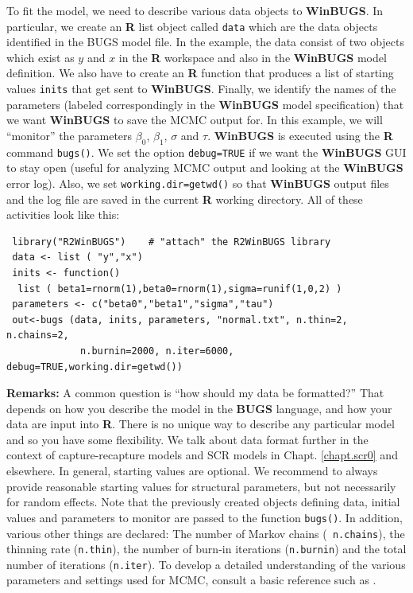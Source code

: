 To fit the model, we need to describe various data objects to {\bf
  WinBUGS}. In particular,
we create an {\bf R} list object called \mbox{\tt data} which
are the data objects identified in the BUGS model file.
 In the example, the
data consist of two objects which exist as $y$ and $x$ in the {\bf R}
workspace and also in the {\bf WinBUGS} model definition.
 We also have to create an {\bf R} function
that produces a list of starting values \mbox{\tt inits} that get sent to
{\bf WinBUGS}.
 Finally, we identify
the names of the parameters (labeled correspondingly in the {\bf WinBUGS}
model specification) that we want {\bf WinBUGS} to save the MCMC output
for. In this example, we will ``monitor'' the parameters
$\beta_0$, $\beta_1$, $\sigma$ and $\tau$.
{\bf WinBUGS} is executed using the {\bf R} command
\mbox{\tt bugs()}.
We set the option \mbox{\tt debug=TRUE} if we want the {\bf WinBUGS}
GUI to stay open (useful for analyzing MCMC output and looking at the
{\bf WinBUGS} error log). Also, we set \mbox{\tt working.dir=getwd()}
so that {\bf WinBUGS} output files and the log file are saved in the
current {\bf R} working directory.
  All of these activities look like this:
{\small
\begin{verbatim}
 library("R2WinBUGS")    # "attach" the R2WinBUGS library
 data <- list ( "y","x")
 inits <- function()
  list ( beta1=rnorm(1),beta0=rnorm(1),sigma=runif(1,0,2) )
 parameters <- c("beta0","beta1","sigma","tau")
 out<-bugs (data, inits, parameters, "normal.txt", n.thin=2, n.chains=2,
             n.burnin=2000, n.iter=6000, debug=TRUE,working.dir=getwd())
\end{verbatim}
}

{\bf Remarks:} A common question is ``how should my data be
formatted?'' That depends on how you describe the model in the {\bf
  BUGS} language, and how your data are input into {\bf R}.
 There is no unique way to describe any
particular model and so you have some flexibility. We talk about data
format further in the context of capture-recapture models and SCR
models in Chapt. \ref{chapt.scr0} and elsewhere.  In general,
starting values are optional. We recommend to always provide
reasonable starting values for structural parameters, but not
necessarily for random effects.  Note that the previously created
objects defining data, initial values and parameters to monitor are
passed to the function \mbox{\tt bugs()}.  In addition, various other
things are declared: The number of Markov chains (\mbox{\tt
  n.chains}), the thinning rate (\mbox{\tt n.thin}),
the number of burn-in iterations (\mbox{\tt n.burnin}) and the total
number of iterations
(\mbox{\tt n.iter}).
To develop a detailed understanding of the various parameters and
settings used for MCMC, consult a basic reference such as
\citet{kery:2010}.



